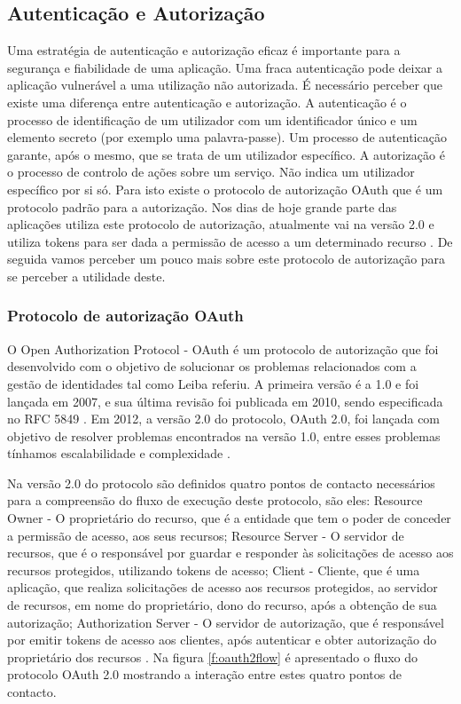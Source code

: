 \subsection{Autenticação e Autorização}

Uma estratégia de autenticação e autorização eficaz é importante para a segurança e fiabilidade de uma aplicação. Uma fraca autenticação pode deixar a aplicação vulnerável a uma utilização não autorizada. É necessário perceber que existe uma diferença entre autenticação e autorização. A autenticação é o processo de identificação de um utilizador com um identificador único e um elemento secreto (por exemplo uma palavra-passe). Um processo de autenticação garante, após o mesmo, que se trata de um utilizador específico. A autorização é o processo de controlo de ações sobre um serviço. Não indica um utilizador específico por si só. Para isto existe o protocolo de autorização OAuth que é um protocolo padrão para a autorização. Nos dias de hoje grande parte das aplicações utiliza este protocolo de autorização, atualmente vai na versão 2.0 e utiliza tokens para ser dada a permissão de acesso a um determinado recurso \cite{oauth20}. De seguida vamos perceber um pouco mais sobre este protocolo de autorização para se perceber a utilidade deste.

\subsubsection{Protocolo de autorização OAuth}
O Open Authorization Protocol - OAuth é um protocolo de autorização que foi desenvolvido com o objetivo de solucionar os problemas relacionados com a gestão de identidades tal como Leiba \cite{leiba_oauth} referiu.
 A primeira versão é a 1.0 e foi lançada em 2007, e sua última revisão foi publicada em 2010, sendo especificada no \gls{RFC} 5849 \cite{oauth10}. Em 2012, a versão 2.0 do protocolo, OAuth 2.0, foi lançada com objetivo de resolver problemas encontrados
na versão 1.0, entre esses problemas tínhamos escalabilidade e complexidade \cite{oauth20}.
\par
Na versão 2.0 do protocolo são definidos quatro pontos de contacto necessários para a compreensão do fluxo de execução deste protocolo, são eles: Resource Owner - O proprietário do recurso, que é a entidade que tem o poder de conceder a permissão de acesso, aos seus recursos; Resource Server - O servidor de recursos, que é o responsável por guardar e responder às solicitações de acesso aos recursos protegidos, utilizando tokens de acesso; Client - Cliente, que é uma aplicação, que realiza solicitações de acesso aos recursos protegidos, ao servidor de recursos, em nome do proprietário, dono do recurso, após a obtenção de sua autorização; Authorization Server - O servidor de autorização, que é responsável por emitir tokens de acesso aos clientes, após autenticar e obter autorização do proprietário dos recursos \cite{oauth20}. Na figura \ref{f:oauth2flow} é apresentado o fluxo do protocolo OAuth 2.0 mostrando a interação entre estes quatro pontos de contacto.

